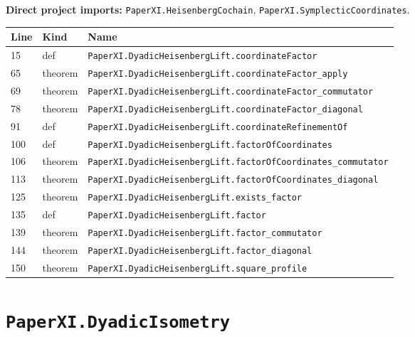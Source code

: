 \documentclass[10pt,oneside]{book}
\begin{document}
\textbf{Direct project imports:} \nolinkurl{PaperXI.HeisenbergCochain}, \nolinkurl{PaperXI.SymplecticCoordinates}.

\begin{longtable}{@{}p{}p{}p{}@{}}\toprule Line&Kind&Name\\\midrule\endhead

15&def&\nolinkurl{PaperXI.DyadicHeisenbergLift.coordinateFactor}\\

65&theorem&\nolinkurl{PaperXI.DyadicHeisenbergLift.coordinateFactor_apply}\\

69&theorem&\nolinkurl{PaperXI.DyadicHeisenbergLift.coordinateFactor_commutator}\\

78&theorem&\nolinkurl{PaperXI.DyadicHeisenbergLift.coordinateFactor_diagonal}\\

91&def&\nolinkurl{PaperXI.DyadicHeisenbergLift.coordinateRefinementOf}\\

100&def&\nolinkurl{PaperXI.DyadicHeisenbergLift.factorOfCoordinates}\\

106&theorem&\nolinkurl{PaperXI.DyadicHeisenbergLift.factorOfCoordinates_commutator}\\

113&theorem&\nolinkurl{PaperXI.DyadicHeisenbergLift.factorOfCoordinates_diagonal}\\

125&theorem&\nolinkurl{PaperXI.DyadicHeisenbergLift.exists_factor}\\

135&def&\nolinkurl{PaperXI.DyadicHeisenbergLift.factor}\\

139&theorem&\nolinkurl{PaperXI.DyadicHeisenbergLift.factor_commutator}\\

144&theorem&\nolinkurl{PaperXI.DyadicHeisenbergLift.factor_diagonal}\\

150&theorem&\nolinkurl{PaperXI.DyadicHeisenbergLift.square_profile}\\

\bottomrule\end{longtable}

\section{\texorpdfstring{\nolinkurl{PaperXI.DyadicIsometry}}{PaperXI.DyadicIsometry}}\label{module:PaperXI.DyadicIsometry}
\end{document}
